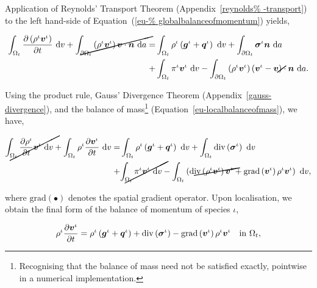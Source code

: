 Application of Reynolds' Transport Theorem (Appendix~\ref{reynolds%
  -transport}) to the left hand-side of Equation~(\ref{eu-%
  globalbalanceofmomentum}) yields,

\begin{equation*}
\begin{split}
\int_{\Omega_{t}} \frac{\partial
  \left(\rho^{\iota}\bv^{\iota}\right)}{\partial t} \ \mathrm{d}v
+\cancel{\int_{\partial \Omega_{t}}
  \left(\rho^{\iota}\bv^{\iota}\right) \bv \cdot \bn\ \mathrm{d}a} = &
\int_{\Omega_{t}} \rho^{\iota} \left(\bg^{\iota}+\bq^{\iota}\right)
\ \mathrm{d}v + \int_{\partial \Omega_{t}}
\Bsigma^{\iota}\bn\ \mathrm{d}a\\ + & \int_{\Omega_{t}}
\pi^{\iota}\bv^{\iota} \ \mathrm{d}v - \int_{\partial \Omega_{t}}
\left(\rho^{\iota} \bv^{\iota} \right)\left(\bv^{\iota} -
\cancel{\bv}\right) \cdot \bn\ \mathrm{d}a.
\end{split}
\end{equation*}

\noindent Using the product rule, Gauss' Divergence Theorem
(Appendix~\ref{gauss-divergence}), and the balance of
mass{\footnote{Recognising that the balance of mass need not be
    satisfied exactly, pointwise in a numerical implementation.}}
(Equation~\ref{eu-localbalanceofmass}), we have,

\begin{equation*}
\begin{split}
\cancel{\int_{\Omega_{t}} \frac{\partial \rho^{\iota}} {\partial t}
  \bv^{\iota} \ \mathrm{d}v} + \int_{\Omega_{t}} \rho^{\iota}
\frac{\partial \bv^{\iota}} {\partial t} \ \mathrm{d}v = &
\int_{\Omega_{t}} \rho^{\iota} \left(\bg^{\iota}+\bq^{\iota}\right)
\ \mathrm{d}v + \int_{\Omega_{t}}
\mathrm{div}\left(\Bsigma^{\iota}\right)\ \mathrm{d}v\\ + &
\cancel{\int_{\Omega_{t}} \pi^{\iota}\bv^{\iota} \ \mathrm{d}v} -
\int_{\Omega_{t}}\left(\cancel{\mathrm{div}
  \left(\rho^{\iota}\bv^{\iota}\right) \bv^{\iota}} +
\mathrm{grad}\left(\bv^{\iota}\right)
\rho^{\iota}\bv^{\iota}\right)\ \mathrm{d}v,
\end{split}
\end{equation*}

\noindent where $\mathrm{grad} (\bullet)$ denotes the spatial gradient
operator. Upon localisation, we obtain the final form of the balance
of momentum of species $\iota$,

\begin{equation}
\rho^{\iota} \frac{\partial \mbox{\boldmath$ v$}^{\iota}} {\partial t} = \rho^{\iota}
\left(\mbox{\boldmath$ g$}^{\iota}+\mbox{\boldmath$ q$}^{\iota}\right) +
\mathrm{div}\left(\mbox{\boldmath$\sigma$}^{\iota}\right) -
\mathrm{grad}\left(\mbox{\boldmath$ v$}^{\iota}\right) \rho^{\iota}\mbox{\boldmath$ v$}^{\iota} \quad
\mathrm{in}\ \Omega_{t},
\label{eu-localbalanceofmomentum}
\end{equation}

